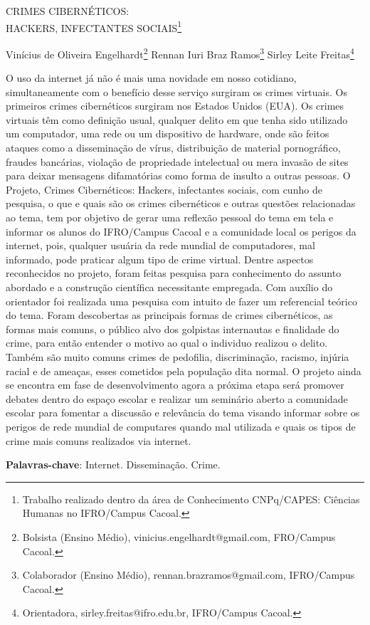 \documentclass[article,12pt,onesidea,4paper,english,brazil]{abntex2}
\begin{document}
	
	
	\frenchspacing 
	
	\begin{center}
		\LARGE CRIMES CIBERNÉTICOS:\\HACKERS, INFECTANTES SOCIAIS\footnote{Trabalho realizado dentro da área de Conhecimento CNPq/CAPES: Ciências Humanas no IFRO/Campus Cacoal.}
		
		\normalsize
		Vinícius de Oliveira Engelhardt\footnote{Bolsista (Ensino Médio), vinicius.engelhardt@gmail.com, FRO/Campus Cacoal.} 
		Rennan Iuri Braz Ramos\footnote{Colaborador (Ensino Médio), rennan.brazramos@gmail.com, IFRO/Campus Cacoal.} 
		Sirley Leite Freitas\footnote{Orientadora, sirley.freitas@ifro.edu.br, IFRO/Campus Cacoal.} 
	\end{center}
	
	\noindent O uso da internet já não é mais uma novidade em nosso cotidiano, simultaneamente com o benefício desse serviço surgiram os crimes virtuais. Os primeiros crimes cibernéticos surgiram nos Estados Unidos (EUA). Os crimes virtuais têm como definição usual, qualquer delito em que tenha sido utilizado um computador, uma rede ou um dispositivo de hardware, onde são feitos ataques como a disseminação de vírus, distribuição de material pornográfico, fraudes bancárias, violação de propriedade intelectual ou mera invasão de sites para deixar mensagens difamatórias como forma de insulto a outras pessoas. O Projeto, Crimes Cibernéticos: Hackers, infectantes sociais, com cunho de pesquisa, o que e quais são os crimes cibernéticos e outras questões relacionadas ao tema, tem por objetivo de gerar uma reflexão pessoal do tema em tela e informar os alunos do IFRO/Campus Cacoal e a comunidade local os perigos da internet, pois, qualquer usuária da rede mundial de computadores, mal informado, pode praticar algum tipo de crime virtual. Dentre aspectos reconhecidos no projeto, foram feitas pesquisa para conhecimento do assunto abordado e a construção científica necessitante empregada. Com auxílio do orientador foi realizada uma pesquisa com intuito de fazer um referencial teórico do tema. Foram descobertas as principais formas de crimes cibernéticos, as formas mais comuns, o público alvo dos golpistas internautas e finalidade do crime, para então entender o motivo ao qual o individuo realizou o delito. Também são muito comuns crimes de pedofilia, discriminação, racismo, injúria racial e de ameaças, esses cometidos pela população dita normal. O projeto ainda se encontra em fase de desenvolvimento agora a próxima etapa será promover debates dentro do espaço escolar e realizar um seminário aberto a comunidade escolar para fomentar a discussão e relevância do tema visando informar sobre os perigos de rede mundial de computares quando mal utilizada e quais os tipos de crime mais comuns realizados via internet.
	
	\vspace{\onelineskip}
	
	\noindent
	\textbf{Palavras-chave}: Internet. Disseminação. Crime.
	
\end{document}
